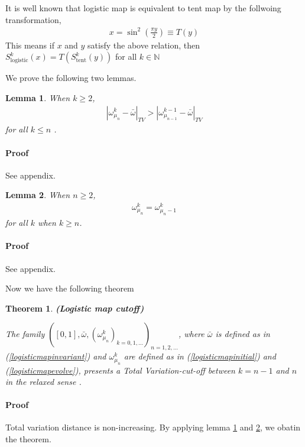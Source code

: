 \documentclass{article}
\newtheorem{theorem}{Theorem}
\newtheorem{lemma}{Lemma}
\begin{document}
It is well known that logistic map is equivalent to tent map by the follwoing transformation,
\begin{eqnarray} 
\label{tltransformation}
  x = \sin^2 \left(\frac{\pi y}{2}\right) \equiv T(y)
\end{eqnarray}
This means if $x$ and $y$ satisfy the above relation, then $S_\text{logistic}^k(x) = T(S_\text{tent}^k(y))$ for all $k \in \mathbb{N}$


We prove the following two lemmas.
\begin{lemma}
\label{klenlemma}
When $k \ge 2$,
  \begin{eqnarray} 
     |\omega_{\mu_n}^k - \bar{\omega}|_{TV}>|\omega_{\mu_{n-1}}^{k-1} - \bar{\omega}|_{TV}
  \end{eqnarray}
for all $k \le n$ .
\end{lemma}
\paragraph{Proof} See appendix.


\begin{lemma}
\label{kgenlemma}
When $n \ge 2$,
  \begin{eqnarray}
     \omega_{\mu_n}^k = \omega_{\mu_n-1}^{k}
  \end{eqnarray}
for all $k$ when $k \ge n$.
\end{lemma}
\paragraph{Proof} See appendix.



Now we have the following theorem
\begin{theorem} {\bfseries (Logistic map cutoff)}

The family $([0,1],\bar{\omega}, (\omega^k_{\mu_n})_{k=0,1,...})_{n=1,2,...}$, where $\bar{\omega}$ is defined as in (\ref{logisticmapinvariant}) and $\omega^k_{\mu_n}$ are defined as in (\ref{logisticmapinitial}) and (\ref{logisticmapevolve}), presents a Total Variation-cut-off between $k=n-1$ and $n$ in the relaxed sense .
\end{theorem}

\paragraph{Proof}
Total variation distance is non-increasing. By applying lemma \ref{klenlemma} and \ref{kgenlemma}, we obatin the theorem. 
\end{document}
